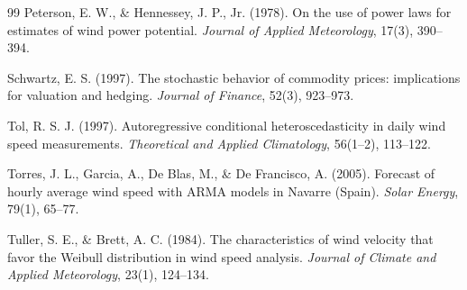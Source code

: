 \begin{thebibliography}{99}
Peterson, E. W., \& Hennessey, J. P., Jr. (1978).
On the use of power laws for estimates of wind power potential.
\textit{Journal of Applied Meteorology}, 17(3), 390--394.

Schwartz, E. S. (1997).
The stochastic behavior of commodity prices: implications for valuation and hedging.
\textit{Journal of Finance}, 52(3), 923--973.

Tol, R. S. J. (1997).
Autoregressive conditional heteroscedasticity in daily wind speed measurements.
\textit{Theoretical and Applied Climatology}, 56(1--2), 113--122.

Torres, J. L., Garcia, A., De Blas, M., \& De Francisco, A. (2005).
Forecast of hourly average wind speed with ARMA models in Navarre (Spain).
\textit{Solar Energy}, 79(1), 65--77.

Tuller, S. E., \& Brett, A. C. (1984).
The characteristics of wind velocity that favor the Weibull distribution in wind speed analysis.
\textit{Journal of Climate and Applied Meteorology}, 23(1), 124--134.

\end{thebibliography}
